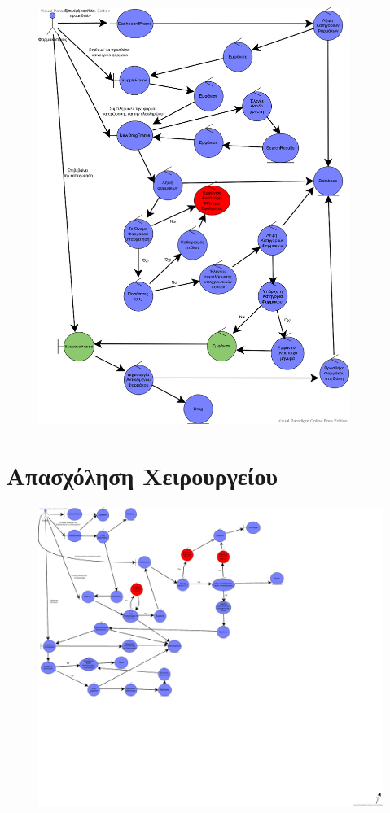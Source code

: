 \documentclass{article}
\begin{document}
\begin{figure}[!htb]
        \centering
        \includegraphics[width=0.9\textwidth]{Medicine Insertion.png}
\end{figure}

\newpage

\section{Απασχόληση Χειρουργείου}

\vspace{0.2cm}

\begin{figure}[!htb]
        \centering
        \includegraphics[width=1.1\textwidth]{OR Occupation.png}
\end{figure}
\end{document}
